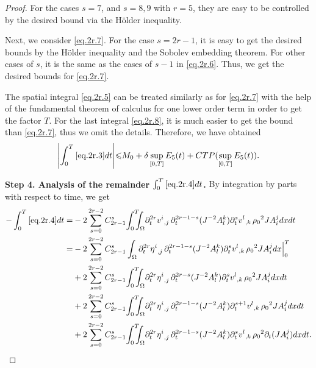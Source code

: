 \documentclass[12pt,twoside,reqno]{amsart}
\numberwithin{equation}{section}
\theoremstyle{definition}
\theoremstyle{remark}
\begin{document}
\begin{proof}
For the cases $s=7$, and $s=8,9$ with $r=5$, they are easy to be controlled by the desired bound via the H\"older inequality.

Next, we consider \eqref{eq.2r.7}. For the case $s=2r-1$, it is easy to get the desired bounds by the H\"older inequality and the Sobolev embedding theorem. For other cases of $s$, it is the same as the cases of $s-1$ in \eqref{eq.2r.6}. Thus, we get the desired bounds for \eqref{eq.2r.7}.

The spatial integral \eqref{eq.2r.5} can be treated similarly as for \eqref{eq.2r.7} with the help of the fundamental theorem of calculus for one lower order term in order to get the factor $T$. For the last integral \eqref{eq.2r.8}, it is much easier to get the bound than \eqref{eq.2r.7}, thus we omit the details. Therefore, we have obtained
\begin{align*}
  {\left\vert{\int_0^T\eqref{eq.2r.3}dt}\right\vert}{\leqslant} M_0+\delta \sup_{[0,T]}E_5(t)+CTP(\sup_{[0,T]}E_5(t)).
\end{align*}

\textbf{Step 4. Analysis of the remainder $\int_0^T\eqref{eq.2r.4}dt$.} By integration by parts with respect to time, we get
\begin{align}
-\int_0^T\eqref{eq.2r.4}dt=&-2\sum_{s=0}^{2r-2}C_{2r-1}^s {\int_0^T\!\!\!\!\int_\Omega }{\partial}_t^{2r}{{{v^i}}_{,{j}}\,}{\partial}_t^{2r-1-s} (J^{-2}A_l^k){\partial}_t^s {{{v^l}}_{,{k}}\,}{\rho_0}^2  J A^j_i dxdt{\nonumber}\\
  =&-2\sum_{s=0}^{2r-2}C_{2r-1}^s \int_\Omega{\partial}_t^{2r}{{{\eta^i}}_{,{j}}\,}{\partial}_t^{2r-1-s} (J^{-2}A_l^k){\partial}_t^s {{{v^l}}_{,{k}}\,}{\rho_0}^2  J A^j_i dx\Big|_0^T\label{eq.2r.40}\\
  &+2\sum_{s=0}^{2r-2}C_{2r-1}^s {\int_0^T\!\!\!\!\int_\Omega }{\partial}_t^{2r}{{{\eta^i}}_{,{j}}\,}{\partial}_t^{2r-s} (J^{-2}A_l^k){\partial}_t^s {{{v^l}}_{,{k}}\,}{\rho_0}^2  J A^j_i dxdt\label{eq.2r.41}\\
  &+2\sum_{s=0}^{2r-2}C_{2r-1}^s {\int_0^T\!\!\!\!\int_\Omega }{\partial}_t^{2r}{{{\eta^i}}_{,{j}}\,}{\partial}_t^{2r-1-s} (J^{-2}A_l^k){\partial}_t^{s+1} {{{v^l}}_{,{k}}\,}{\rho_0}^2  J A^j_i dxdt\label{eq.2r.42}\\
  &+2\sum_{s=0}^{2r-2}C_{2r-1}^s {\int_0^T\!\!\!\!\int_\Omega }{\partial}_t^{2r}{{{\eta^i}}_{,{j}}\,}{\partial}_t^{2r-1-s} (J^{-2}A_l^k){\partial}_t^s {{{v^l}}_{,{k}}\,}{\rho_0}^2  {\partial}_t(J A^j_i) dxdt.\label{eq.2r.43}
\end{align}


\end{proof}
\end{document}
